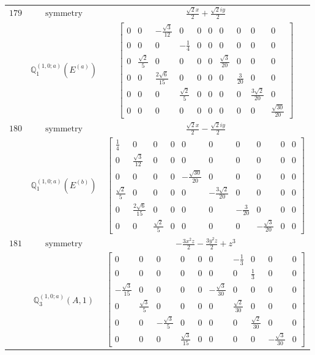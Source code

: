 \documentclass[fleqn,8pt,landscape]{jsarticle}
\begin{document}
\begin{longtable}{ccc}
$ 179 $ & $ \text{symmetry} $ & $ \frac{\sqrt{2} x}{2} + \frac{\sqrt{2} i y}{2} $ \\
$  $ & $ \mathbb{Q}_{1}^{(1,0;a)}(E^{(a)}) $ & $ \begin{bmatrix} 0 & 0 & - \frac{\sqrt{3}}{12} & 0 & 0 & 0 & 0 & 0 & 0 & 0 \\ 0 & 0 & 0 & - \frac{1}{4} & 0 & 0 & 0 & 0 & 0 & 0 \\ 0 & \frac{\sqrt{2}}{5} & 0 & 0 & 0 & 0 & \frac{\sqrt{3}}{20} & 0 & 0 & 0 \\ 0 & 0 & \frac{2 \sqrt{6}}{15} & 0 & 0 & 0 & 0 & \frac{3}{20} & 0 & 0 \\ 0 & 0 & 0 & \frac{\sqrt{2}}{5} & 0 & 0 & 0 & 0 & \frac{3 \sqrt{2}}{20} & 0 \\ 0 & 0 & 0 & 0 & 0 & 0 & 0 & 0 & 0 & \frac{\sqrt{30}}{20} \end{bmatrix} $ \\ \hline
$ 180 $ & $ \text{symmetry} $ & $ \frac{\sqrt{2} x}{2} - \frac{\sqrt{2} i y}{2} $ \\
$  $ & $ \mathbb{Q}_{1}^{(1,0;a)}(E^{(b)}) $ & $ \begin{bmatrix} \frac{1}{4} & 0 & 0 & 0 & 0 & 0 & 0 & 0 & 0 & 0 \\ 0 & \frac{\sqrt{3}}{12} & 0 & 0 & 0 & 0 & 0 & 0 & 0 & 0 \\ 0 & 0 & 0 & 0 & - \frac{\sqrt{30}}{20} & 0 & 0 & 0 & 0 & 0 \\ \frac{\sqrt{2}}{5} & 0 & 0 & 0 & 0 & - \frac{3 \sqrt{2}}{20} & 0 & 0 & 0 & 0 \\ 0 & \frac{2 \sqrt{6}}{15} & 0 & 0 & 0 & 0 & - \frac{3}{20} & 0 & 0 & 0 \\ 0 & 0 & \frac{\sqrt{2}}{5} & 0 & 0 & 0 & 0 & - \frac{\sqrt{3}}{20} & 0 & 0 \end{bmatrix} $ \\ \hline
$ 181 $ & $ \text{symmetry} $ & $ - \frac{3 x^{2} z}{2} - \frac{3 y^{2} z}{2} + z^{3} $ \\
$  $ & $ \mathbb{Q}_{3}^{(1,0;a)}(A,1) $ & $ \begin{bmatrix} 0 & 0 & 0 & 0 & 0 & 0 & - \frac{1}{3} & 0 & 0 & 0 \\ 0 & 0 & 0 & 0 & 0 & 0 & 0 & \frac{1}{3} & 0 & 0 \\ - \frac{\sqrt{3}}{15} & 0 & 0 & 0 & 0 & - \frac{\sqrt{3}}{30} & 0 & 0 & 0 & 0 \\ 0 & \frac{\sqrt{3}}{5} & 0 & 0 & 0 & 0 & \frac{\sqrt{2}}{30} & 0 & 0 & 0 \\ 0 & 0 & - \frac{\sqrt{3}}{5} & 0 & 0 & 0 & 0 & \frac{\sqrt{2}}{30} & 0 & 0 \\ 0 & 0 & 0 & \frac{\sqrt{3}}{15} & 0 & 0 & 0 & 0 & - \frac{\sqrt{3}}{30} & 0 \end{bmatrix} $ \\ \hline

\end{longtable}
\end{document}
